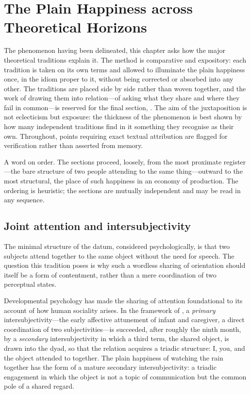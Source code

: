 \section{The Plain Happiness across Theoretical Horizons}
\label{p19:sec:theories}

\noindent
The phenomenon having been delineated, this chapter asks how the major theoretical traditions explain it. The method is comparative and expository: each tradition is taken on its own terms and allowed to illuminate the plain happiness once, in the idiom proper to it, without being corrected or absorbed into any other. The traditions are placed side by side rather than woven together, and the work of drawing them into relation---of asking what they share and where they fail in common---is reserved for the final section, . The aim of the juxtaposition is not eclecticism but exposure: the thickness of the phenomenon is best shown by how many independent traditions find in it something they recognise as their own. Throughout, points requiring exact textual attribution are flagged for verification rather than asserted from memory.

A word on order. The sections proceed, loosely, from the most proximate register---the bare structure of two people attending to the same thing---outward to the most structural, the place of such happiness in an economy of production. The ordering is heuristic; the sections are mutually independent and may be read in any sequence.

\subsection{Joint attention and intersubjectivity}
\label{p19:sub:theories-joint}

The minimal structure of the datum, considered psychologically, is that two subjects attend together to the same object without the need for speech. The question this tradition poses is why such a wordless sharing of orientation should itself be a form of contentment, rather than a mere coordination of two perceptual states.

Developmental psychology has made the sharing of attention foundational to its account of how human sociality arises. In the framework of \textcite{trevarthen1979}, a \emph{primary} intersubjectivity---the early affective attunement of infant and caregiver, a direct coordination of two subjectivities---is succeeded, after roughly the ninth month, by a \emph{secondary} intersubjectivity in which a third term, the shared object, is drawn into the dyad, so that the relation acquires a triadic structure: I, you, and the object attended to together. The plain happiness of watching the rain together has the form of a mature secondary intersubjectivity: a triadic engagement in which the object is not a topic of communication but the common pole of a shared regard.

